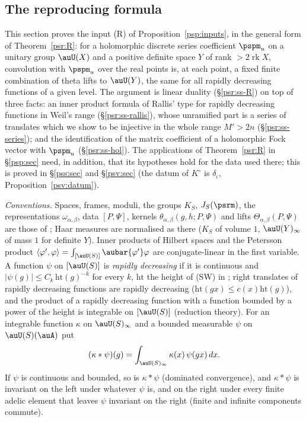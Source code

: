 \documentclass[10pt]{amsart}
\theoremstyle{definition}
\theoremstyle{remark}
\begin{document}
\subsection{The reproducing formula}\label{psr:sec}

This section proves the input (R) of Proposition~\ref{psp:inputs}, in the general form of
Theorem~\ref{psr:R}: for a holomorphic discrete series coefficient $\pspm_u$ on a unitary group
$\auU(X)$ and a positive definite space $Y$ of rank $>2\operatorname{rk}X$, convolution with $\pspm_u$
over the real points is, at each point, a fixed finite combination of theta lifts to $\auU(Y)$, the
same for all rapidly decreasing functions of a given level. The argument is linear duality
(\S\ref{psr:ss-R}) on top of three facts: an inner product formula of Rallis' type for rapidly
decreasing functions in Weil's range (\S\ref{psr:ss-rallis}), whose unramified part is a series of
translates which we show to be injective in the whole range $M'>2n$ (\S\ref{psr:ss-series}); and the
identification of the matrix coefficient of a holomorphic Fock vector with $\pspm_u$
(\S\ref{psr:ss-hol}). The applications of Theorem~\ref{psr:R} in \S\ref{psp:sec} need, in addition,
that its hypotheses hold for the data used there; this is proved in \S\ref{pss:sec} and \S\ref{psv:sec}
(the datum of $K^\circ$ is $\delta_\iota$, Proposition~\ref{psv:datum}).

\emph{Conventions.} Spaces, frames, moduli, the groups $K_S$, $J_S(\psrm)$, the representations
$\omega_{\alpha,\beta}$, data $[P,\Psi]$, kernels $\theta_{\alpha,\beta}(g,h;P,\Psi)$ and lifts
$\Theta_{\alpha,\beta}(P,\Psi)$ are those of {\cite[\S2.3]{P53}}; Haar measures are normalised as
there ($K_S$ of volume $1$, $\auU(Y)_\infty$ of mass $1$ for definite $Y$). Inner products of Hilbert
spaces and the Petersson product $\langle\varphi',\varphi\rangle=\int_{[\auU(S)]}\aubar{\varphi'}
\varphi$ are conjugate-linear in the first variable. A function $\psi$ on $[\auU(S)]$ is
\emph{rapidly decreasing} if it is continuous and $|\psi(g)|\le C_k\,\mathrm{ht}(g)^{-k}$ for every
$k$, $\mathrm{ht}$ the height of (SW) in {\cite[Lemma~2.13]{P53}}; right translates of rapidly decreasing
functions are rapidly decreasing ($\mathrm{ht}(gx)\le c(x)\mathrm{ht}(g)$), and the product of a
rapidly decreasing function with a function bounded by a power of the height is integrable on
$[\auU(S)]$ (reduction theory). For an integrable function $\kappa$ on $\auU(S)_\infty$ and a bounded
measurable $\psi$ on $\auU(S)(\auA)$ put
\[
(\kappa*\psi)(g)=\int_{\auU(S)_\infty}\kappa(x)\,\psi(gx)\,dx .
\]
If $\psi$ is continuous and bounded, so is $\kappa*\psi$ (dominated convergence), and
$\kappa*\psi$ is invariant on the left under whatever $\psi$ is, and on the right under every finite
adelic element that leaves $\psi$ invariant on the right (finite and infinite components commute).
\end{document}
